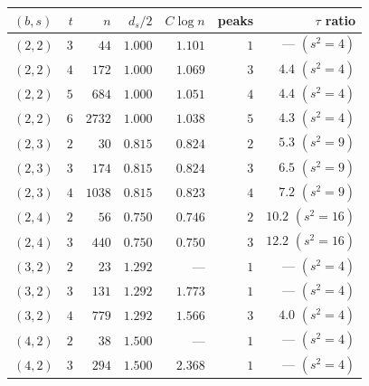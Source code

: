 \begin{center}
\footnotesize\setlength{\tabcolsep}{4pt}
\begin{tabular}{lrrrrrr}
\hline
$(b,s)$ & $t$ & $n$ & $d_s/2$ & $C\log n$ & peaks & $\tau$ ratio\\
\hline
$(2,2)$ & $3$ & $44$ & $1.000$ & $1.101$ & $1$ & --- \quad$(s^2{=}4)$\\
$(2,2)$ & $4$ & $172$ & $1.000$ & $1.069$ & $3$ & $4.4$ \quad$(s^2{=}4)$\\
$(2,2)$ & $5$ & $684$ & $1.000$ & $1.051$ & $4$ & $4.4$ \quad$(s^2{=}4)$\\
$(2,2)$ & $6$ & $2732$ & $1.000$ & $1.038$ & $5$ & $4.3$ \quad$(s^2{=}4)$\\
$(2,3)$ & $2$ & $30$ & $0.815$ & $0.824$ & $2$ & $5.3$ \quad$(s^2{=}9)$\\
$(2,3)$ & $3$ & $174$ & $0.815$ & $0.824$ & $3$ & $6.5$ \quad$(s^2{=}9)$\\
$(2,3)$ & $4$ & $1038$ & $0.815$ & $0.823$ & $4$ & $7.2$ \quad$(s^2{=}9)$\\
$(2,4)$ & $2$ & $56$ & $0.750$ & $0.746$ & $2$ & $10.2$ \quad$(s^2{=}16)$\\
$(2,4)$ & $3$ & $440$ & $0.750$ & $0.750$ & $3$ & $12.2$ \quad$(s^2{=}16)$\\
$(3,2)$ & $2$ & $23$ & $1.292$ & --- & $1$ & --- \quad$(s^2{=}4)$\\
$(3,2)$ & $3$ & $131$ & $1.292$ & $1.773$ & $1$ & --- \quad$(s^2{=}4)$\\
$(3,2)$ & $4$ & $779$ & $1.292$ & $1.566$ & $3$ & $4.0$ \quad$(s^2{=}4)$\\
$(4,2)$ & $2$ & $38$ & $1.500$ & --- & $1$ & --- \quad$(s^2{=}4)$\\
$(4,2)$ & $3$ & $294$ & $1.500$ & $2.368$ & $1$ & --- \quad$(s^2{=}4)$\\
\hline
\end{tabular}
\end{center}
